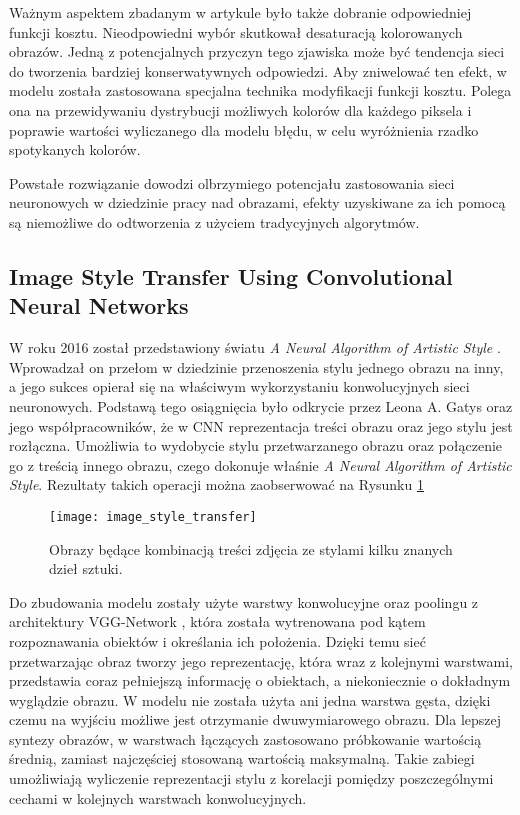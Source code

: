     Ważnym aspektem zbadanym w artykule było także dobranie odpowiedniej
    funkcji kosztu. Nieodpowiedni wybór skutkował desaturacją kolorowanych
    obrazów. Jedną z potencjalnych przyczyn tego zjawiska może być tendencja
    sieci do tworzenia bardziej konserwatywnych odpowiedzi. Aby zniwelować ten
    efekt, w modelu została zastosowana specjalna technika modyfikacji
    funkcji kosztu. Polega ona na przewidywaniu dystrybucji możliwych kolorów
    dla każdego piksela i poprawie wartości wyliczanego dla modelu błędu, w celu
    wyróżnienia rzadko spotykanych kolorów.

    Powstałe rozwiązanie dowodzi olbrzymiego potencjału zastosowania sieci
    neuronowych w dziedzinie pracy nad obrazami, efekty uzyskiwane za ich pomocą
    są niemożliwe do odtworzenia z użyciem tradycyjnych algorytmów.

  \subsection{Image Style Transfer Using Convolutional Neural Networks}

    W roku 2016 został przedstawiony światu \textit{A Neural Algorithm of Artistic Style}
    \cite{image_style_transfer}. Wprowadzał on przełom w dziedzinie przenoszenia
    stylu jednego obrazu na inny, a jego sukces opierał się na właściwym wykorzystaniu
    konwolucyjnych sieci neuronowych. Podstawą tego osiągnięcia było odkrycie przez
    Leona A. Gatys oraz jego współpracowników, że w CNN reprezentacja treści
    obrazu oraz jego stylu jest rozłączna. Umożliwia to wydobycie stylu
    przetwarzanego obrazu oraz połączenie go z treścią innego obrazu, czego
    dokonuje właśnie \textit{A Neural Algorithm of Artistic Style}. Rezultaty takich
    operacji można zaobserwować na Rysunku \ref{fig:image_style_transfer}

    \begin{figure}[H]
      \centering
      \texttt{[image: image\_style\_transfer]}
      \caption[Obrazy będące kombinacją treści zdjęcia ze stylami kilku znanych dzieł sztuki - źródło:
      \cite{image_style_transfer}]
      {Obrazy będące kombinacją treści zdjęcia ze stylami kilku znanych dzieł sztuki.}
      \label{fig:image_style_transfer}
    \end{figure}

    Do zbudowania modelu zostały użyte warstwy konwolucyjne oraz poolingu z
    architektury VGG-Network \cite{vgg_network}, która została wytrenowana pod
    kątem rozpoznawania obiektów i określania ich położenia. Dzięki temu sieć
    przetwarzając obraz tworzy jego reprezentację, która wraz z
    kolejnymi warstwami, przedstawia coraz pełniejszą informację o obiektach,
    a niekoniecznie o dokładnym wyglądzie obrazu.
    W modelu nie została użyta ani jedna warstwa gęsta, dzięki czemu na wyjściu
    możliwe jest otrzymanie dwuwymiarowego obrazu.
    Dla lepszej syntezy obrazów, w warstwach
    łączących zastosowano próbkowanie wartością średnią, zamiast najczęściej
    stosowaną wartością maksymalną.
    Takie zabiegi umożliwiają wyliczenie reprezentacji stylu z korelacji
    pomiędzy poszczególnymi cechami w kolejnych warstwach konwolucyjnych.

